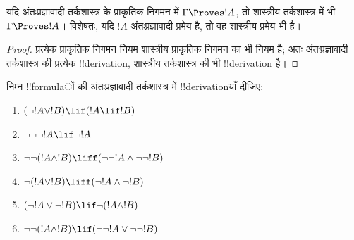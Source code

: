 \documentclass[../../../include/open-logic-section]{subfiles}
\begin{document}
\begin{prop}
  यदि अंतःप्रज्ञावादी तर्कशास्त्र के प्राकृतिक निगमन में
  $\Gamma \Proves !A$, तो शास्त्रीय तर्कशास्त्र में भी
  $\Gamma \Proves !A$। विशेषतः, यदि $!A$ अंतःप्रज्ञावादी प्रमेय है, तो वह
  शास्त्रीय प्रमेय भी है।
\end{prop}

\begin{proof}
  प्रत्येक प्राकृतिक निगमन नियम शास्त्रीय प्राकृतिक निगमन का भी नियम है;
  अतः अंतःप्रज्ञावादी तर्कशास्त्र की प्रत्येक !!{derivation}, शास्त्रीय
  तर्कशास्त्र की भी !!{derivation} है।
\end{proof}

\begin{prob}
  निम्न !!{formula}ों की अंतःप्रज्ञावादी तर्कशास्त्र में !!{derivation}याँ
  दीजिए:
  \begin{enumerate}
    \item $(\lnot !A \lor !B) \lif (!A \lif !B)$
    \item $\lnot\lnot\lnot !A \lif \lnot !A$
    \item $\lnot\lnot (!A \land !B) \liff (\lnot\lnot !A\land \lnot \lnot !B)$
    \item $\lnot (!A \lor !B) \liff (\lnot !A \land \lnot !B)$
    \item $(\lnot !A \lor \lnot !B) \lif \lnot (!A \land !B)$
    \item $\lnot\lnot ( !A \land !B) \lif  (\lnot\lnot !A \lor
    \lnot\lnot !B)$
  \end{enumerate}
\end{prob}
\end{document}
